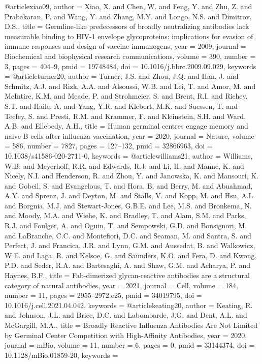 @article{xiao09,
  author = {Xiao, X. and Chen, W. and Feng, Y. and Zhu, Z. and Prabakaran, P. and Wang, Y. and Zhang, M.Y. and Longo, N.S. and Dimitrov, D.S.},
  title = {Germline-like predecessors of broadly neutralizing antibodies lack measurable binding to HIV-1 envelope glycoproteins: implications for evasion of immune responses and design of vaccine immunogens},
  year = 2009,
  journal = {Biochemical and biophysical research communications},
  volume = 390,
  number = 3,
  pages = {404--9},
  pmid = 19748484,
  doi = {10.1016/j.bbrc.2009.09.029},
  keywords = {}
}
@article{turner20,
  author = {Turner, J.S. and Zhou, J.Q. and Han, J. and Schmitz, A.J. and Rizk, A.A. and Alsoussi, W.B. and Lei, T. and Amor, M. and McIntire, K.M. and Meade, P. and Strohmeier, S. and Brent, R.I. and Richey, S.T. and Haile, A. and Yang, Y.R. and Klebert, M.K. and Suessen, T. and Teefey, S. and Presti, R.M. and Krammer, F. and Kleinstein, S.H. and Ward, A.B. and Ellebedy, A.H.},
  title = {Human germinal centres engage memory and naive B cells after influenza vaccination},
  year = 2020,
  journal = {Nature},
  volume = 586,
  number = 7827,
  pages = {127--132},
  pmid = 32866963,
  doi = {10.1038/s41586-020-2711-0},
  keywords = {}
}
@article{williams21,
  author = {Williams, W.B. and Meyerhoff, R.R. and Edwards, R.J. and Li, H. and Manne, K. and Nicely, N.I. and Henderson, R. and Zhou, Y. and Janowska, K. and Mansouri, K. and Gobeil, S. and Evangelous, T. and Hora, B. and Berry, M. and Abuahmad, A.Y. and Sprenz, J. and Deyton, M. and Stalls, V. and Kopp, M. and Hsu, A.L. and Borgnia, M.J. and Stewart-Jones, G.B.E. and Lee, M.S. and Bronkema, N. and Moody, M.A. and Wiehe, K. and Bradley, T. and Alam, S.M. and Parks, R.J. and Foulger, A. and Oguin, T. and Sempowski, G.D. and Bonsignori, M. and LaBranche, C.C. and Montefiori, D.C. and Seaman, M. and Santra, S. and Perfect, J. and Francica, J.R. and Lynn, G.M. and Aussedat, B. and Walkowicz, W.E. and Laga, R. and Kelsoe, G. and Saunders, K.O. and Fera, D. and Kwong, P.D. and Seder, R.A. and Bartesaghi, A. and Shaw, G.M. and Acharya, P. and Haynes, B.F.},
  title = {Fab-dimerized glycan-reactive antibodies are a structural category of natural antibodies},
  year = 2021,
  journal = {Cell},
  volume = 184,
  number = 11,
  pages = {2955--2972.e25},
  pmid = 34019795,
  doi = {10.1016/j.cell.2021.04.042},
  keywords = {}
}
@article{keating20,
  author = {Keating, R. and Johnson, J.L. and Brice, D.C. and Labombarde, J.G. and Dent, A.L. and McGargill, M.A.},
  title = {Broadly Reactive Influenza Antibodies Are Not Limited by Germinal Center Competition with High-Affinity Antibodies},
  year = 2020,
  journal = {mBio},
  volume = 11,
  number = 6,
  pages = {0},
  pmid = 33144374,
  doi = {10.1128/mBio.01859-20},
  keywords = {}
}
